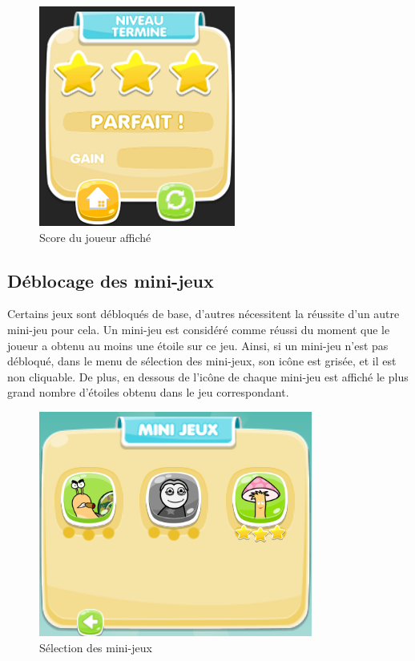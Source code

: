 \begin{figure}[H]\centering
  \includegraphics[scale=.9]{./img/MenuMort.png}
  \caption{Score du joueur affiché}
\end{figure}

\subsection{Déblocage des mini-jeux}

Certains jeux sont débloqués de base, d'autres nécessitent la réussite d'un autre mini-jeu pour cela. Un mini-jeu est considéré comme réussi du moment que le joueur a obtenu au moins une étoile sur ce jeu. Ainsi, si un mini-jeu n'est pas débloqué, dans le menu de sélection des mini-jeux, son icône est grisée, et il est non cliquable. De plus, en dessous de l'icône de chaque mini-jeu est affiché le plus grand nombre d'étoiles obtenu dans le jeu correspondant.

\begin{figure}[H]\centering
  \includegraphics[scale=.9]{./img/SelectionMiniJeu.png}
  \caption{Sélection des mini-jeux}
  \label{SelectionMiniJeu}
\end{figure}

